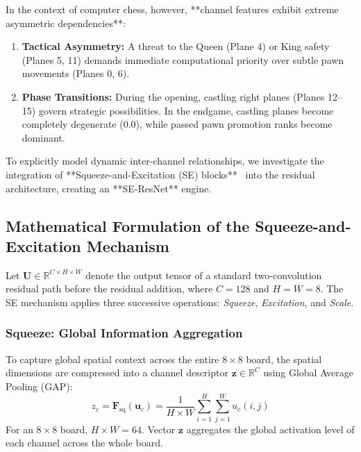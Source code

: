 \documentclass[10pt,journal,compsoc]{IEEEtran}
\begin{document}
In the context of computer chess, however, **channel features exhibit extreme asymmetric dependencies**:
\begin{enumerate}
    \item \textbf{Tactical Asymmetry:} A threat to the Queen (Plane 4) or King safety (Planes 5, 11) demands immediate computational priority over subtle pawn movements (Planes 0, 6).
    \item \textbf{Phase Transitions:} During the opening, castling right planes (Planes 12--15) govern strategic possibilities. In the endgame, castling planes become completely degenerate ($0.0$), while passed pawn promotion ranks become dominant.
\end{enumerate}

To explicitly model dynamic inter-channel relationships, we investigate the integration of **Squeeze-and-Excitation (SE) blocks**~\cite{hu2018squeeze} into the residual architecture, creating an **SE-ResNet** engine.

\subsection{Mathematical Formulation of the Squeeze-and-Excitation Mechanism}
Let $\mathbf{U} \in \mathbb{R}^{C \times H \times W}$ denote the output tensor of a standard two-convolution residual path before the residual addition, where $C = 128$ and $H = W = 8$. The SE mechanism applies three successive operations: \textit{Squeeze}, \textit{Excitation}, and \textit{Scale}.

\subsubsection{Squeeze: Global Information Aggregation}
To capture global spatial context across the entire $8 \times 8$ board, the spatial dimensions are compressed into a channel descriptor $\mathbf{z} \in \mathbb{R}^C$ using Global Average Pooling (GAP):
\begin{equation}
z_c = \mathbf{F}_{\text{sq}}(\mathbf{u}_c) = \frac{1}{H \times W} \sum_{i=1}^H \sum_{j=1}^W u_c(i, j)
\end{equation}
For an $8 \times 8$ board, $H \times W = 64$. Vector $\mathbf{z}$ aggregates the global activation level of each channel across the whole board.
\end{document}
